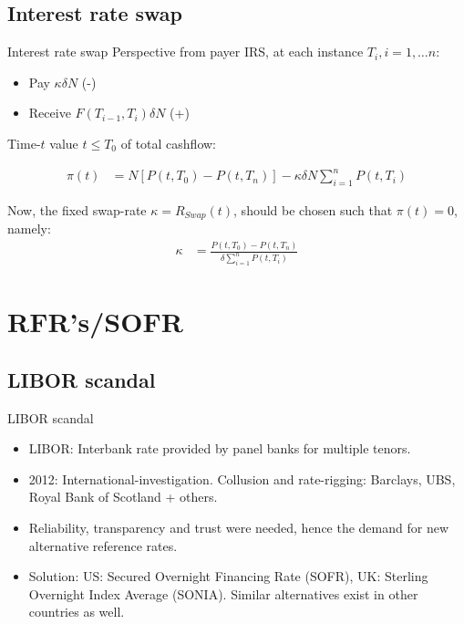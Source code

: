 \documentclass[UKenglish]{beamer}
\begin{document}
\subsection{Interest rate swap}

\begin{frame}{Interest rate swap}
Perspective from payer IRS, at each instance $T_{i} , i = 1, \dots n$: 
\begin{itemize}
    \item Pay $\kappa \delta N$ (-)
    \item Receive $F(T_{i-1}, T_{i})\delta N$ (+)
\end{itemize}

Time-$t$ value $t\leq T_{0}$ of total cashflow: 

\begin{align*}
\pi(t) &= N[P(t,T_{0})- P(t,T_{n})] - \kappa \delta N \sum_{i=1}^{n}P(t,T_{i})     
\end{align*}

Now, the fixed swap-rate $\kappa = R_{Swap}(t)$, should be chosen such that $\pi(t) = 0$, namely: 
\begin{align*}
\kappa &= \frac{
P(t,T_{0}) - P(t,T_{n})
}{
\delta \sum_{i=1}^{n}P(t,T_{i})
}    
\end{align*}

\end{frame}


\section{RFR's/SOFR}
\SectionPage

\subsection{LIBOR scandal}
\begin{frame}{LIBOR scandal}
\begin{itemize}
    \item LIBOR: Interbank rate provided by panel banks for multiple tenors. 
    \item 2012: International-investigation. Collusion and rate-rigging: Barclays, UBS, Royal Bank of Scotland + others. 
    \item Reliability, transparency and trust were needed, hence the demand for new alternative reference rates.
    \item Solution: US: Secured Overnight Financing Rate (SOFR), UK: Sterling Overnight Index Average (SONIA). Similar alternatives exist in other countries as well.  
\end{itemize}
\end{frame}
\end{document}

